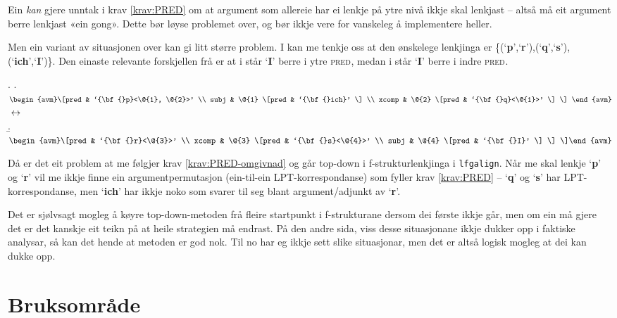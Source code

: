 \documentclass[11pt,a4paper,oneside,draft]{book}
\newcommand{\F}[2]{\textsc{#1}\ensuremath{_{#2}}}
\newcommand{\PRED}{\F{pred}{}}
\newcommand{\p}[1]{`\textbf{#1}'}
\begin{document}
 Ein \emph{kan} gjere unntak i krav \ref{krav:PRED} om at argument som
 allereie har ei lenkje på ytre nivå ikkje skal lenkjast -- altså må
 eit argument berre lenkjast «ein gong». Dette bør løyse problemet
 over, og bør ikkje vere for vanskeleg å implementere heller.

 Men ein variant av situasjonen over kan gi litt større problem. I
 \Next kan me tenkje oss at den ønskelege lenkjinga er
 \{(\p{p},\p{r}),(\p{q},\p{s}),(\p{ich},\p{I})\}. Den einaste
 relevante forskjellen frå \Last er at i \Last står \p{I} berre i ytre
 \PRED, medan i \Next står \p{I} berre i indre \PRED.

{\avmoptions{}
\ex. \a. $\begin{avm}\[pred & `{\bf{}p}<\@{1}, \@{2}>'  \\
     subj & \@{1} \[pred &  `{\bf{}ich}' \] \\
     xcomp & \@{2} \[pred & `{\bf{}q}<\@{1}>' \] \] \end{avm}$
     $\\\\\leftrightarrow$\\
     \b. $\begin{avm}\[pred & `{\bf{}r}<\@{3}>' \\
     xcomp & \@{3} \[pred & `{\bf{}s}<\@{4}>' \\
     subj & \@{4} \[pred &  `{\bf{}I}' \] \] \]\end{avm}$

}

 Då er det eit problem at me følgjer krav \ref{krav:PRED-omgivnad} og
 går top-down i f-strukturlenkjinga i \texttt{lfgalign}. Når me skal lenkje
 \p{p} og \p{r} vil me ikkje finne ein argumentpermutasjon
 (ein-til-ein LPT-korrespondanse) som fyller krav \ref{krav:PRED} --
 \p{q} og \p{s} har LPT-korrespondanse, men \p{ich} har ikkje noko som
 svarer til seg blant argument/adjunkt av \p{r}.

 Det er sjølvsagt mogleg å køyre top-down-metoden frå fleire
 startpunkt i f-strukturane dersom dei første ikkje går, men om ein må
 gjere det er det kanskje eit teikn på at heile strategien må
 endrast. På den andre sida, viss desse situasjonane ikkje dukker opp
 i faktiske analysar, så kan det hende at metoden er god nok. Til no
 har eg ikkje sett slike situasjonar, men det er altså logisk mogleg
 at dei kan dukke opp.
\section{Bruksområde}
\label{sec-5.5}
\end{document}
